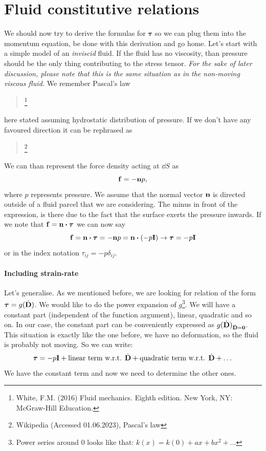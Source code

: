 \documentclass[a4paper]{article}
\begin{document}
\section{Fluid constitutive relations}

We should now try to derive the formulas for \(\bm{\tau}\) so we can plug
them into the momentum equation, be done with this derivation and go home.
Let's start with a simple model of an \emph{inviscid} fluid. If the fluid
has no viscosity, than pressure should be the only thing contributing to
the stress tensor. \emph{For the sake of later discussion, please note that
	this is the same situation as in the non-moving viscous fluid.} We remember
Pascal's law
\begin{quote}
	\footnote{%
		White, F.M. (2016) Fluid mechanics. Eighth edition. New York,
		NY: McGraw-Hill Education.}
\end{quote}
here stated assuming hydrostatic distribution of pressure. If we don't have
any favoured direction it can be rephrased as
\begin{quote}
	\footnote{%
		Wikipedia (Accessed 01.06.2023), Pascal's law}
\end{quote}
We can than represent the force density acting at \(\dd{S}\) as
\[
	\vb{f} = -\vb{n}p,
\]
where \(p\) represents pressure. We assume that the normal vector \(\vb{n}\) is
directed outside of a fluid parcel that we are considering. The minus in front
of the expression, is there due to the fact that the surface exerts the pressure
inwards. If we note that \(\vb{f} = \vb{n}\dotproduct\bm{\tau}\) we can now say
\[
	\vb{f} = \vb{n}\dotproduct\bm{\tau} = -\vb{n}p = \vb{n}\dotproduct \qty( -p\vb{I} )
	\rightarrow \bm{\tau} = -p \vb{I}
\]
or in the index notation \(\tau_{ij} = -p \delta_{ij}\).

\paragraph{Including strain-rate}
Let's generalise. As we mentioned before, we are looking for
relation of the form \(\bm{\tau} = g(\dot{\vb{D}})\). We would like to do the
power expansion of \(g\)\footnote{Power series around 0 looks like that:
	\(k(x) = k(0) + ax + bx^2 + \dots\)}. We will have a constant part (independent
of the function argument), linear, quadratic and so on. In our case, the
constant part can be conveniently expressed as
\(g(\dot{\vb{D}})_{\dot{\vb{D}} = \vb{0}}\). This situation is exactly like the
one before, we have no deformation, so the fluid is probably not moving. So
we can write:
\[
	\bm{\tau} = -p\vb{I} + \text{linear term w.r.t. } \dot{\vb{D}}
	+ \text{quadratic term w.r.t. } \dot{\vb{D}} + \dots
\]
We have the constant term and now we need to determine the other ones.
\end{document}
